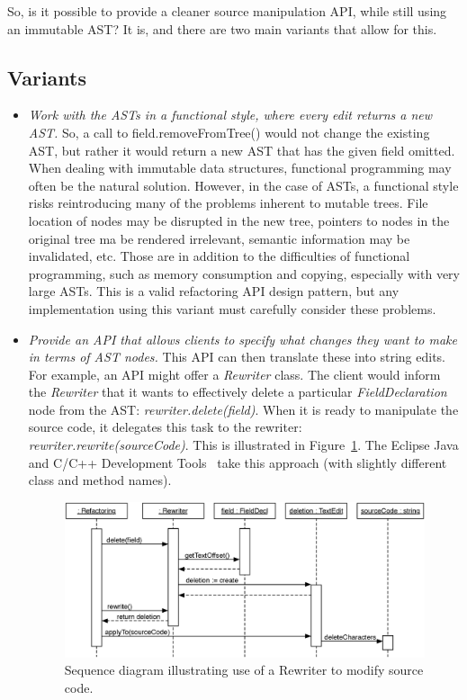 \documentclass[prodmode]{acmlarge}
\begin{document}
So, is it possible to provide a cleaner source manipulation API, while still
using an immutable AST?  It is, and there are two main variants that allow
for this.

\subsection{Variants}

\begin{itemize}

    \item \textit{Work with the ASTs in a functional style, where every edit
        returns a new AST.} So, a call to field.removeFromTree() would not
        change the existing AST, but rather it would return a new AST that has
        the given field omitted. When dealing with immutable data structures,
        functional programming may often be the natural solution. However,
        in the case of ASTs, a functional style risks reintroducing many of 
        the problems inherent to mutable trees. File location of nodes may
        be disrupted in the new tree, pointers to nodes in the original tree ma
        be rendered 
        irrelevant, semantic information may be invalidated, etc. Those are in
        addition to the difficulties of functional programming, such as memory
        consumption and copying, especially with very large ASTs. This is
        a valid refactoring API design pattern, but any implementation using 
        this variant must carefully consider these problems.

    \item \textit{Provide an API that allows clients to specify what changes
        they want to make in terms of AST nodes.}  This API can then translate these into string edits.  For example, an API might offer a \textit{Rewriter} 
class. The client would inform the \textit{Rewriter} that it wants to 
effectively delete a particular \textit{FieldDeclaration} node from the AST:
\textit{rewriter.delete(field)}.  When it is ready to manipulate the source
code, it delegates this task to the rewriter:
\textit{rewriter.rewrite(sourceCode)}.  This is illustrated in
Figure~\ref{fig:seq-diagram}.  The Eclipse Java and C/C++ Development
Tools~\cite{cdt-refactoring} take this approach (with slightly different class
and method names).

\begin{figure}[!bt]
\begin{center}
\includegraphics[width=.9\textwidth]{seq-diagram.eps}
\end{center}
\caption{Sequence diagram illustrating use of a Rewriter to modify source code.}
\label{fig:seq-diagram}
\end{figure}


\end{itemize}
\end{document}
